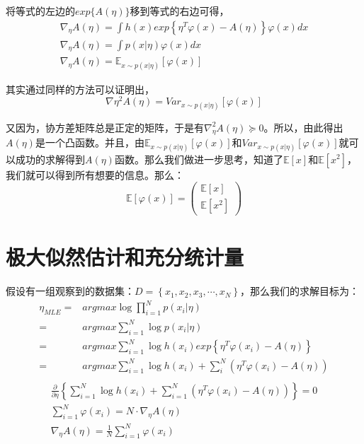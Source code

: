 \documentclass[a4paper]{article}
\begin{document}
将等式的左边的$exp \{A(\eta)\} $移到等式的右边可得，
\begin{gather}
    \nabla _{\eta}A(\eta) = \int h(x)exp\left\{ \eta^T\varphi(x) - A(\eta)\right\}\varphi(x) dx \\
    \nabla _{\eta}A(\eta) = \int p(x|\eta)\varphi(x)dx \\
    \nabla _{\eta}A(\eta) = \mathbb{E}_{x \sim p(x|\eta)}[\varphi(x)]
\end{gather}

其实通过同样的方法可以证明出，
\begin{equation}
    \nabla{\eta}^2A(\eta) = Var_{x \sim p(x|\eta)}[\varphi(x)]
\end{equation}

又因为，协方差矩阵总是正定的矩阵，于是有$\nabla_{\eta}^2A(\eta)\succeq  0$。所以，由此得出$A(\eta)$是一个凸函数。并且，由$\mathbb{E}_{x \sim p(x|\eta)}[\varphi(x)]$和$Var_{x \sim p(x|\eta)}[\varphi(x)]$就可以成功的求解得到$A(\eta)$函数。那么我们做进一步思考，知道了$\mathbb{E}[x]$和$\mathbb{E}[x^2]$，我们就可以得到所有想要的信息。那么：
\begin{equation}
    \mathbb{E}[\varphi(x)]
    =
    \begin{pmatrix}
        \mathbb{E}[x] \\
        \mathbb{E}[x^2]
    \end{pmatrix}
\end{equation}

\section{极大似然估计和充分统计量}
假设有一组观察到的数据集：$D=\left\{ x_1, x_2, x_3, \cdots, x_N \right\}$，那么我们的求解目标为：
\begin{equation}
    \begin{split}
        \eta_{MLE} = & argmax \log \prod_{i=1}^N p(x_i|\eta) \\
        = & argmax \sum_{i=1}^N\log p(x_i|\eta) \\
        = & argmax \sum_{i=1}^N\log h(x_i) exp \left\{ \eta^T\varphi(x_i) - A(\eta) \right\} \\
        = & argmax \sum_{i=1}^N\log h(x_i) + \sum_{i}^N\left(\eta^T\varphi(x_i) - A(\eta)\right) \\
    \end{split}
\end{equation}
\begin{gather}
    \frac{\partial}{\partial \eta} \left\{ \sum_{i=1}^N\log h(x_i) + \sum_{i=1}^N\left(\eta^T\varphi(x_i) - A(\eta)\right) \right\} = 0 \\
    \sum_{i=1}^N\varphi(x_i) = N \cdot \nabla_{\eta}A(\eta) \\ 
    \nabla_{\eta}A(\eta) = \frac{1}{N}\sum_{i=1}^N\varphi(x_i)
\end{gather}
\end{document}
